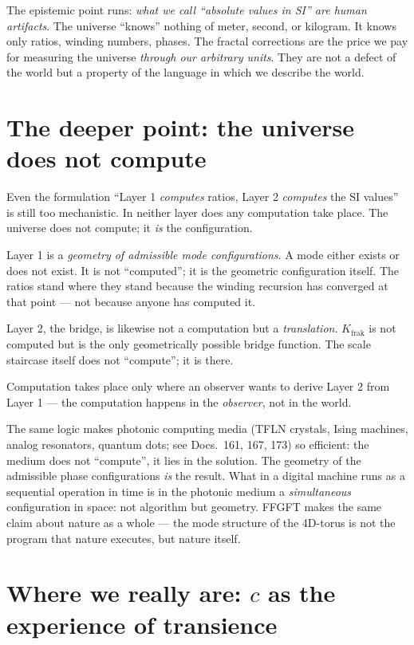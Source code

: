 The epistemic point runs: \emph{what we call ``absolute values in
SI'' are human artifacts}. The universe ``knows'' nothing of meter,
second, or kilogram. It knows only ratios, winding numbers, phases.
The fractal corrections are the price we pay for measuring the
universe \emph{through our arbitrary units}. They are not a defect of
the world but a property of the language in which we describe the
world.

\section{The deeper point: the universe does not compute}

Even the formulation ``Layer 1 \emph{computes} ratios, Layer 2
\emph{computes} the SI values'' is still too mechanistic. In neither
layer does any computation take place. The universe does not compute;
it \emph{is} the configuration.

Layer 1 is a \emph{geometry of admissible mode configurations}. A
mode either exists or does not exist. It is not ``computed''; it is
the geometric configuration itself. The ratios stand where they stand
because the winding recursion has converged at that point --- not
because anyone has computed it.

Layer 2, the bridge, is likewise not a computation but a
\emph{translation}. $K_{\mathrm{frak}}$ is not computed but is the
only geometrically possible bridge function. The scale staircase
itself does not ``compute''; it is there.

Computation takes place only where an observer wants to derive Layer 2
from Layer 1 --- the computation happens in the \emph{observer}, not
in the world.

The same logic makes photonic computing media (TFLN crystals, Ising
machines, analog resonators, quantum dots; see Docs.~161, 167, 173)
so efficient: the medium does not ``compute'', it lies in the
solution. The geometry of the admissible phase configurations
\emph{is} the result. What in a digital machine runs as a sequential
operation in time is in the photonic medium a \emph{simultaneous}
configuration in space: not algorithm but geometry. FFGFT makes the
same claim about nature as a whole --- the mode structure of the
4D-torus is not the program that nature executes, but nature itself.

\section{Where we really are: $c$ as the experience of transience}

